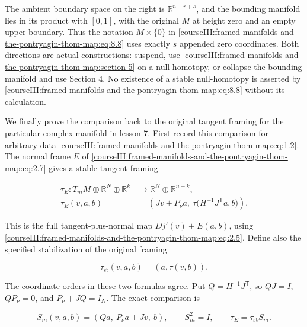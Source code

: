 The ambient boundary space on the right is \(\mathbb R^{n+r+s}\), and the bounding manifold lies in its product with \([0,1]\), with the original \(M\) at height zero and an empty upper boundary. Thus the notation \(M\times\{0\}\) in \eqref{courseIII:framed-manifolds-and-the-pontryagin-thom-map:eq:8.8} uses exactly \(s\) appended zero coordinates. Both directions are actual constructions: suspend, use \cref{courseIII:framed-manifolds-and-the-pontryagin-thom-map:section-5} on a null-homotopy, or collapse the bounding manifold and use Section 4. No existence of a stable null-homotopy is asserted by \eqref{courseIII:framed-manifolds-and-the-pontryagin-thom-map:eq:8.8} without its calculation.

We finally prove the comparison back to the original tangent framing for the particular complex manifold in lesson 7. First record this comparison for arbitrary data \eqref{courseIII:framed-manifolds-and-the-pontryagin-thom-map:eq:1.2}. The normal frame \(E\) of \eqref{courseIII:framed-manifolds-and-the-pontryagin-thom-map:eq:2.7} gives a stable tangent framing

\begin{equation}
\begin{aligned}
 \tau_E:T_mM\oplus\mathbb R^N\oplus\mathbb R^k
       &\longrightarrow \mathbb R^N\oplus\mathbb R^{n+k},\\
 \tau_E(v,a,b)&=
 \left(Jv+P_\nu a,\
             \tau\bigl(H^{-1}J^{\mathsf T}a,b\bigr)\right).
 \end{aligned}
 \label{courseIII:framed-manifolds-and-the-pontryagin-thom-map:eq:8.9}
\end{equation}

This is the full tangent-plus-normal map \(Dj'(v)+E(a,b)\), using \eqref{courseIII:framed-manifolds-and-the-pontryagin-thom-map:eq:2.5}. Define also the specified stabilization of the original framing

\begin{equation}
\tau_{\mathrm{st}}(v,a,b)=(a,\tau(v,b)).
 \label{courseIII:framed-manifolds-and-the-pontryagin-thom-map:eq:8.10}
\end{equation}

The coordinate orders in these two formulas agree. Put \(Q=H^{-1}J^{\mathsf T}\), so \(QJ=I\), \(QP_\nu=0\), and \(P_\nu+JQ=I_N\). The exact comparison is

\begin{equation}
S_m(v,a,b)=(Qa,\ P_\nu a+Jv,\ b),\qquad
 S_m^2=I,\qquad
 \tau_E=\tau_{\mathrm{st}}S_m.
 \label{courseIII:framed-manifolds-and-the-pontryagin-thom-map:eq:8.11}
\end{equation}

